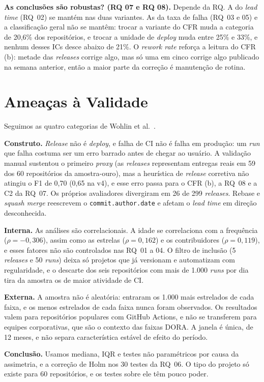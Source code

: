\textbf{As conclusões são robustas? (RQ 07 e RQ 08).} Depende da RQ. A do \textit{lead time}
(RQ~02) se mantém nas duas variantes. As da taxa de falha (RQ~03 e 05) e a classificação geral
não se mantêm: trocar a variante do CFR muda a categoria de 20,6\% dos repositórios, e trocar a
unidade de \textit{deploy} muda entre 25\% e 33\%, e nenhum desses ICs desce abaixo de 21\%. O
\textit{rework rate} reforça a leitura do CFR (b): metade das \textit{releases} corrige algo, mas
só uma em cinco corrige algo publicado na semana anterior, então a maior parte da correção é
manutenção de rotina.

\section{Ameaças à Validade}

Seguimos as quatro categorias de Wohlin et al.~\cite{wohlin2012}.

\textbf{Construto.} \textit{Release} não é \textit{deploy}, e falha de CI não é falha em
produção: um \textit{run} que falha costuma ser um erro barrado antes de chegar ao usuário. A
validação manual sustentou o primeiro \textit{proxy} (as \textit{releases} representam entregas
reais em 59 dos 60 repositórios da amostra-ouro), mas a heurística de \textit{release} corretiva
não atingiu o F1 de 0,70 (0,65 na v4), e esse erro passa para o CFR (b), a RQ~08 e a C2 da
RQ~07. Os próprios avaliadores divergiram em 26 de 299 \textit{releases}. Rebase e
\textit{squash merge} reescrevem o \texttt{commit.author.date} e afetam o \textit{lead time}
em direção desconhecida.

\textbf{Interna.} As análises são correlacionais. A idade se correlaciona com a frequência
($\rho = -0{,}306$), assim como as estrelas ($\rho = 0{,}162$) e os contribuidores
($\rho = 0{,}119$), e esses fatores não são controlados nas RQ~01 a 04. O filtro de inclusão
(5 \textit{releases} e 50 \textit{runs}) deixa só projetos que já versionam e automatizam com
regularidade, e o descarte dos seis repositórios com mais de 1.000 \textit{runs} por dia tira
da amostra os de maior atividade de CI.

\textbf{Externa.} A amostra não é aleatória: entraram os 1.000 mais estrelados de cada faixa, e
os menos estrelados de cada faixa nunca foram observados. Os resultados valem para repositórios
populares com GitHub Actions, e não se transferem para equipes corporativas, que são o contexto
das faixas DORA. A janela é única, de 12 meses, e não separa característica estável de efeito
do período.

\textbf{Conclusão.} Usamos mediana, IQR e testes não paramétricos por causa da assimetria, e a
correção de Holm nos 30 testes da RQ~06. O tipo do projeto só existe para 60 repositórios, e os
testes sobre ele têm pouco poder.
